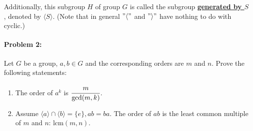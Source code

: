 \documentclass[12pt]{scrartcl}
\begin{document}
{{\begin{enumerate}[label=(\alph*)]
\begin{spacing}{1.3}
	\vspace{0.4em}
Additionally, this subgroup $H$ of group $G$ is called the subgroup \underline{\textbf{generated by $S$}}, denoted by $\langle S \rangle.$ (Note that in general $"\langle"$ and $"\rangle"$ have nothing to do with cyclic.)
\end{spacing}
	\vspace{2em}

	\end{enumerate}

\newpage

\paragraph*{Problem 2: }\begin{spacing}{1.4}Let $G$ be a group, $a, b \in G$ and the corresponding orders are $m$ and $n$. Prove the following statements:\end{spacing}

\vspace{-0.5em}
\begin{enumerate}[label=(\alph*)]
\item The order of $a^k$ is $\cfrac{m}{\text{gcd}(m, k)}$.

\vspace{0.5em}
	\begin{spacing}{1.3}\end{spacing}

\vspace{2em} 
	\item \begin{spacing}{1.5} Assume $\langle a \rangle \cap \langle b \rangle = \{e\}, ab = ba.$ The order of $ab$ is the least common multiple of $m$ and $n$: $\text{lcm}(m,n)$.


\end{spacing}
\end{enumerate}}}
\end{document}
